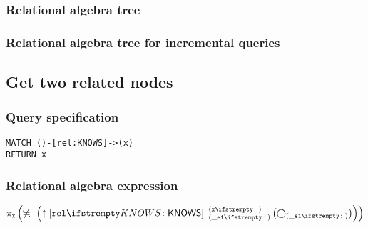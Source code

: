 \subsubsection*{Relational algebra tree}


\subsubsection*{Relational algebra tree for incremental queries}


\subsection{Get two related nodes}

\subsubsection*{Query specification}

\begin{lstlisting}
MATCH ()-[rel:KNOWS]->(x)
RETURN x
\end{lstlisting}

\subsubsection*{Relational algebra expression}

$\projection{\var{x}} \left(\alldifferent{} \left(\expandout{rel}{KNOWS}{\_e1}{x}{} \left(\getvertices{\_e1}{}\right)\right)\right)$

